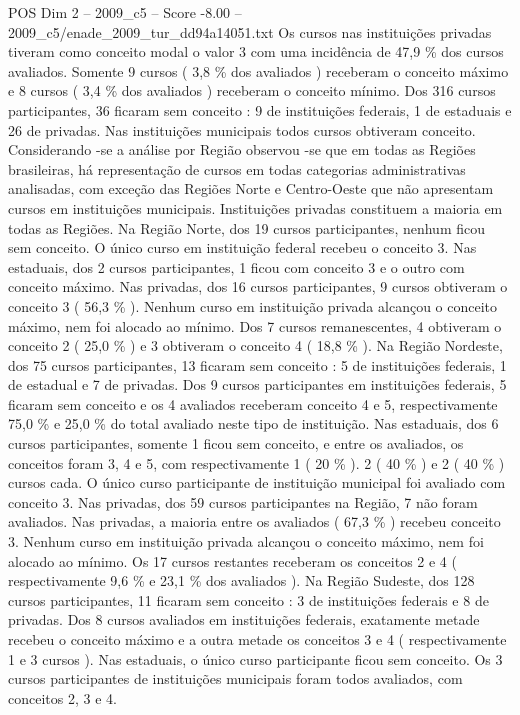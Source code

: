 \begin{textsample}{POS Dim 2 – 2009\_c5 – Score -8.00 – 2009\_c5/enade\_2009\_tur\_dd94a14051.txt}
Os cursos nas instituições privadas tiveram como conceito modal o valor 3 com uma incidência de 47,9 \% dos cursos avaliados.
Somente 9 cursos ( 3,8 \% dos avaliados ) receberam o conceito máximo e 8 cursos ( 3,4 \% dos avaliados ) receberam o conceito mínimo.
Dos 316 cursos participantes, 36 ficaram sem conceito : 9 de instituições federais, 1 de estaduais e 26 de privadas.
Nas instituições municipais todos cursos obtiveram conceito.
Considerando -se a análise por Região observou -se que em todas as Regiões brasileiras, há representação de cursos em todas categorias administrativas analisadas, com exceção das Regiões Norte e Centro-Oeste que não apresentam cursos em instituições municipais.
Instituições privadas constituem a maioria em todas as Regiões.
Na Região Norte, dos 19 cursos participantes, nenhum ficou sem conceito.
O único curso em instituição federal recebeu o conceito 3.
Nas estaduais, dos 2 cursos participantes, 1 ficou com conceito 3 e o outro com conceito máximo.
Nas privadas, dos 16 cursos participantes, 9 cursos obtiveram o conceito 3 ( 56,3 \% ).
Nenhum curso em instituição privada alcançou o conceito máximo, nem foi alocado ao mínimo.
Dos 7 cursos remanescentes, 4 obtiveram o conceito 2 ( 25,0 \% ) e 3 obtiveram o conceito 4 ( 18,8 \% ).
Na Região Nordeste, dos 75 cursos participantes, 13 ficaram sem conceito : 5 de instituições federais, 1 de estadual e 7 de privadas.
Dos 9 cursos participantes em instituições federais, 5 ficaram sem conceito e os 4 avaliados receberam conceito 4 e 5, respectivamente 75,0 \% e 25,0 \% do total avaliado neste tipo de instituição.
Nas estaduais, dos 6 cursos participantes, somente 1 ficou sem conceito, e entre os avaliados, os conceitos foram 3, 4 e 5, com respectivamente 1 ( 20 \% ). 2 ( 40 \% ) e 2 ( 40 \% ) cursos cada.
O único curso participante de instituição municipal foi avaliado com conceito 3.
Nas privadas, dos 59 cursos participantes na Região, 7 não foram avaliados.
Nas privadas, a maioria entre os avaliados ( 67,3 \% ) recebeu conceito 3.
Nenhum curso em instituição privada alcançou o conceito máximo, nem foi alocado ao mínimo.
Os 17 cursos restantes receberam os conceitos 2 e 4 ( respectivamente 9,6 \% e 23,1 \% dos avaliados ).
Na Região Sudeste, dos 128 cursos participantes, 11 ficaram sem conceito : 3 de instituições federais e 8 de privadas.
Dos 8 cursos avaliados em instituições federais, exatamente metade recebeu o conceito máximo e a outra metade os conceitos 3 e 4 ( respectivamente 1 e 3 cursos ).
Nas estaduais, o único curso participante ficou sem conceito.
Os 3 cursos participantes de instituições municipais foram todos avaliados, com conceitos 2, 3 e 4.

\end{textsample}
